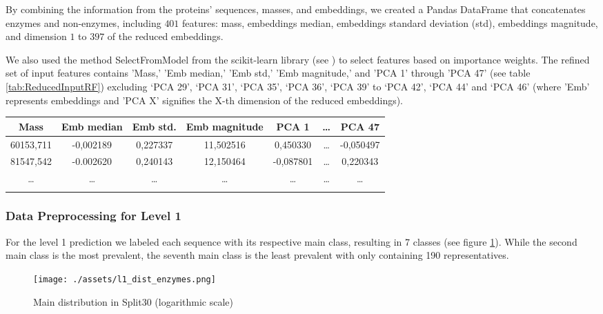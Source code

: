 \documentclass{bioinfo}
\begin{document}
\begin{methods}
By combining the information from the proteins’ sequences, masses, and embeddings, we created a Pandas DataFrame that concatenates enzymes and non-enzymes,
including $401$ features: mass, embeddings median, embeddings standard deviation (std), embeddings magnitude, and dimension $1$ to $397$ of the reduced 
embeddings. 

We also used the method SelectFromModel from the scikit-learn library (see \cite{scikit-learn})
to select features based on importance weights. 
The refined set of input features contains 
'Mass,' 'Emb median,' 'Emb std,' 'Emb magnitude,' and 'PCA 1' through 'PCA 47' (see table \ref{tab:ReducedInputRF}) excluding ‘PCA 29’, ‘PCA 31’, ‘PCA 35’, 
‘PCA 36’, ‘PCA 39’ to ‘PCA 42’, ‘PCA 44’ and ‘PCA 46’ (where 'Emb' represents embeddings and 'PCA X' signifies the X-th dimension of the reduced embeddings).

\begin{table}[!htbp]
\setlength{\tabcolsep}{2pt}
 {
	\begin{tabular}{@{}ccccccc@{}}
		\toprule 
		Mass & Emb median & Emb std. & Emb magnitude & PCA 1 & \dots & PCA 47\\
		\midrule
		60153,711 & -0,002189 & 0,227337 & 11,502516 & 0,450330 & \dots & -0,050497\\
		81547,542 & -0.002620 & 0,240143 & 12,150464 & -0,087801 & \dots & 0,220343 \\
		\dots & \dots & \dots & \dots & \dots & \dots & \dots \\
		\botrule
    \end{tabular}
}{}
\end{table}

\subsubsection{Data Preprocessing for Level 1}
For the level 1 prediction we labeled each sequence with its respective main class,
resulting in 7 classes (see figure \ref{fig:l1_dist_train}).
While the second main class is the most prevalent, 
the seventh main class is the least prevalent with only
containing 190 representatives.

\begin{figure}[ht]
\centering
\texttt{[image: ./assets/l1\_dist\_enzymes.png]}
\caption{Main distribution in Split30 (logarithmic scale)}\label{fig:l1_dist_train}
\end{figure}



\end{methods}
\end{document}
